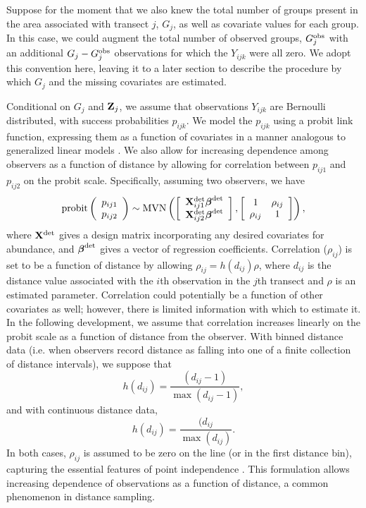 \documentclass[10pt]{article}
\begin{document}
Suppose for the moment that we also knew the total number of groups present in the area associated with transect $j$, $G_j$, as well as covariate values for each group.  In this case, we could augment the total number of observed groups, $G_j^{\rm obs}$ with an additional $G_j-G_j^{\rm obs}$ observations for which the $Y_{ijk}$ were all zero.  We adopt this convention here, leaving it to a later section to describe the procedure by which $G_j$ and the missing covariates are estimated.

Conditional on $G_j$ and ${\bf Z}_j$, we assume that observations $Y_{ijk}$ are Bernoulli distributed, with success probabilities $p_{ijk}$.
We model the $p_{ijk}$ using a probit link function, expressing them as a function of covariates in a manner analogous to generalized linear models \cite{McCullaghNelder1989}.  We also allow for increasing dependence among observers as a function of distance by allowing for correlation between $p_{ij1}$ and $p_{ij2}$ on the probit scale. Specifically, assuming two observers, we have
$$
{\rm probit} \left(\begin{array}{c}
				p_{ij1} \\
				p_{ij2}
		\end{array}\right) \sim {\rm MVN}
\left( \left[ \begin{array}{c}
				{\bf X}_{ij1}^{\rm det} \boldsymbol{\beta}^{\rm det}\\
				{\bf X}_{ij2}^{\rm det} \boldsymbol{\beta}^{\rm det}
		\end{array}\right],
        \left[ \begin{array}{cc}
            1 & \rho_{ij} \\
            \rho_{ij} & 1
        \end{array} \right]
\right),
$$
where ${\bf X}^{\rm det}$ gives a design matrix incorporating any desired covariates for abundance, and $\boldsymbol{\beta}^{\rm det}$ gives a vector of regression coefficients.  Correlation ($\rho_{ij}$) is set to be a function of distance by allowing $\rho_{ij} = h(d_{ij}) \rho$, where $d_{ij}$ is the distance value associated with the $i$th observation in the $j$th transect and $\rho$ is an estimated parameter. Correlation could potentially be a function of other covariates as well; however, there is limited information with which to estimate it. In the following development, we assume that correlation increases linearly on the probit scale as a function of distance from the observer.  With binned distance data (i.e. when observers record distance as falling into one of a finite collection of distance intervals), we suppose that
$$
h(d_{ij})=\frac{(d_{ij}-1)}{\max(d_{ij}-1)},
$$
and with continuous distance data,
$$
h(d_{ij})=\frac{(d_{ij}}{\max(d_{ij})}.
$$
In both cases, $\rho_{ij}$ is assumed to be zero on the line (or in the first distance bin), capturing the essential features of point independence \cite{LaakeEtAl2004,BorchersEtAl2006,BucklandEtAl2010}.  This formulation allows increasing dependence of observations as a function of distance, a common phenomenon in distance sampling.
\end{document}
